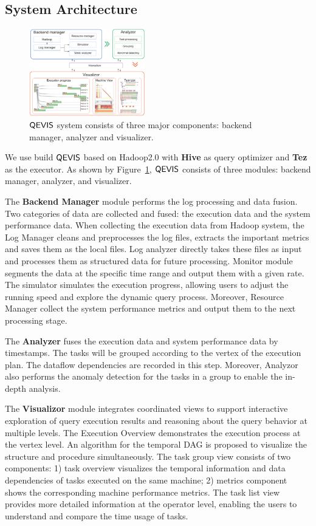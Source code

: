 \subsection{System Architecture}
\begin{figure}[t]
	\centering
	\includegraphics[width=0.45\textwidth]{figures/system/sysdesign.pdf}
	\vspace{-3mm}
	\caption{$\mathsf{QEVIS}$ system consists of three major components: backend manager, analyzer and visualizer.}
	\label{fig:sysdesign}
	\vspace{-3mm}
\end{figure}
We use build $\mathsf{QEVIS}$ based on Hadoop2.0 with \textbf{Hive} as query optimizer and \textbf{Tez} as the executor. As shown by Figure~\ref{fig:sysdesign}, $\mathsf{QEVIS}$ consists of three modules: backend manager, analyzer, and visualizer. 


The \textbf{Backend Manager} module performs the log processing and data fusion. Two categories of data are collected and fused: the execution data and the system performance data.
When collecting the execution data from Hadoop system, the Log Manager cleans and preprocesses the log files, extracts the important metrics and saves them as the local files.
Log analyzer directly takes these files as input and processes them as structured data for future processing.
Monitor module segments the data at the specific time range and output them with a given rate.
The simulator simulates the execution progress, allowing users to adjust the running speed and explore the dynamic query process.
Moreover, Resource Manager collect the system performance metrics and output them to the next processing stage.


The \textbf{Analyzer} fuses the execution data and system performance data by timestamps. The tasks will be grouped according to the vertex of the execution plan. The dataflow dependencies are recorded in this step. Moreover, Analyzor also performs the anomaly detection for the tasks in a group to enable the in-depth analysis.


The \textbf{Visualizor} module integrates coordinated views to support interactive exploration of query execution results and reasoning about the query behavior at multiple levels. The Execution Overview demonstrates the execution process at the vertex level. An algorithm for the temporal DAG is proposed to visualize the structure and procedure simultaneously. The task group view consists of two components: 1) task overview visualizes the temporal information and data dependencies of tasks executed on the same machine; 2) metrics component shows the corresponding machine performance metrics. The task list view provides more detailed information at the operator level, enabling the users to understand and compare the time usage of tasks. 

